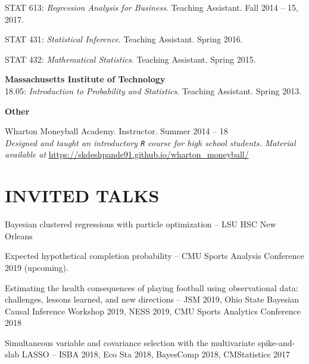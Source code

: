 \documentclass[margin]{res}
\begin{document}
\begin{resume}
STAT 613: {\it Regression Analysis for Business}. Teaching Assistant. Fall 2014 -- 15, 2017.

STAT 431: {\it Statistical Inference}. Teaching Assistant. Spring 2016.

STAT 432: {\it Mathematical Statistics}. Teaching Assistant. Spring 2015.


\textbf{Massachusetts Institute of Technology} \\

18.05: {\it Introduction to Probability and Statistics}. Teaching Assistant. Spring 2013.

\textbf{Other}

Wharton Moneyball Academy. Instructor. Summer 2014 -- 18 \\
\textit{Designed and taught an introductory \texttt{R} course for high school students. Material available at}  \url{https://skdeshpande91.github.io/wharton_moneyball/}

\section{INVITED  \hspace{0.1in} TALKS}

Bayesian clustered regressions with particle optimization -- LSU HSC New Orleans

Expected hypothetical completion probability -- CMU Sports Analysis Conference 2019 (upcoming).

Estimating the health consequences of playing football using observational data: challenges, lessons learned, and new directions -- JSM 2019, Ohio State Bayesian Causal Inference Workshop 2019, NESS 2019, CMU Sports Analytics Conference 2018




Simultaneous variable and covariance selection with the multivariate spike-and-slab LASSO -- ISBA 2018, Eco Sta 2018, BayesComp 2018, CMStatistics 2017



\end{resume}
\end{document}
